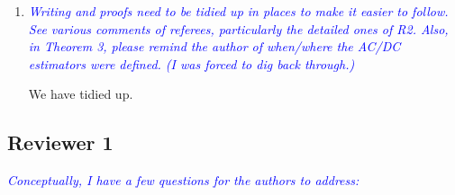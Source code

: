 \documentclass[pdftex,12pt]{article}
\def\rc#1{{\it\textcolor{blue}{#1}}\smallskip}
\begin{document}
\begin{enumerate}
\item \rc{Writing and proofs need to be tidied up in places to make it easier
to follow.  See various comments of referees, particularly the
detailed ones of R2.  Also, in Theorem 3, please remind the author of
when/where the AC/DC estimators were defined.  (I was forced to dig
back through.)}

We have tidied up.

\end{enumerate}

\subsection*{Reviewer 1}

\rc{Conceptually, I have a few questions for the authors to address:}
\end{document}
